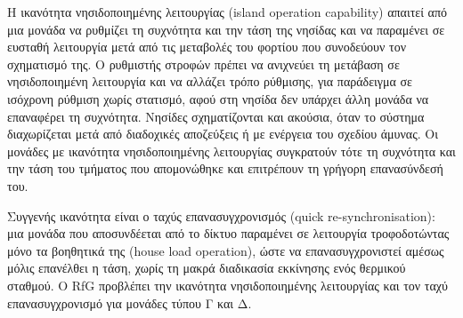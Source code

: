 Η ικανότητα νησιδοποιημένης λειτουργίας (island operation capability) απαιτεί από μια μονάδα
να ρυθμίζει τη συχνότητα και την τάση της νησίδας και να παραμένει σε ευσταθή λειτουργία μετά από
τις μεταβολές του φορτίου που συνοδεύουν τον σχηματισμό της. Ο ρυθμιστής στροφών πρέπει να
ανιχνεύει τη μετάβαση σε νησιδοποιημένη λειτουργία και να αλλάζει τρόπο ρύθμισης, για παράδειγμα σε
ισόχρονη ρύθμιση χωρίς στατισμό, αφού στη νησίδα δεν υπάρχει άλλη μονάδα να επαναφέρει τη
συχνότητα. Νησίδες σχηματίζονται και ακούσια, όταν το σύστημα διαχωρίζεται μετά από διαδοχικές
αποζεύξεις ή με ενέργεια του σχεδίου άμυνας. Οι μονάδες με ικανότητα νησιδοποιημένης λειτουργίας
συγκρατούν τότε τη συχνότητα και την τάση του τμήματος που απομονώθηκε και επιτρέπουν τη
γρήγορη επανασύνδεσή του.

Συγγενής ικανότητα είναι ο ταχύς επανασυγχρονισμός (quick re-synchronisation): μια μονάδα που
αποσυνδέεται από το δίκτυο παραμένει σε λειτουργία τροφοδοτώντας μόνο τα βοηθητικά της
(house load operation), ώστε να επανασυγχρονιστεί αμέσως μόλις επανέλθει η τάση, χωρίς τη
μακρά διαδικασία εκκίνησης ενός θερμικού σταθμού. Ο RfG προβλέπει την ικανότητα
νησιδοποιημένης λειτουργίας και τον ταχύ επανασυγχρονισμό για μονάδες τύπου Γ και Δ.

